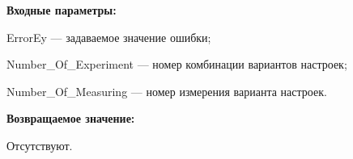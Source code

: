 \textbf{Входные параметры:}

ErrorEy --- задаваемое значение ошибки;
 
    Number\_Of\_Experiment --- номер комбинации вариантов настроек;
 
    Number\_Of\_Measuring --- номер измерения варианта настроек.

\textbf{Возвращаемое значение:}

Отсутствуют.